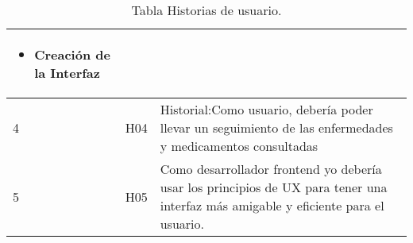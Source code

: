\begin{table}[htb]
\begin{tabular}{|l|p{1.5cm}|p{10cm}|}
\begin{itemize}
		
		\item Creación de la Interfaz
	\end{itemize}\\ \hline

	
	4 & H04  & Historial:Como usuario, debería poder llevar un seguimiento de las enfermedades y medicamentos consultadas \\ \hline
	
	5 & H05  & Como desarrollador frontend yo debería usar los 
	principios de UX para tener una interfaz más amigable 
	y eficiente para el usuario. 
	\\ \hline
	
	
\end{tabular}
\caption{Tabla Historias de usuario.}
\label{tabla:Historial}
\end{table}